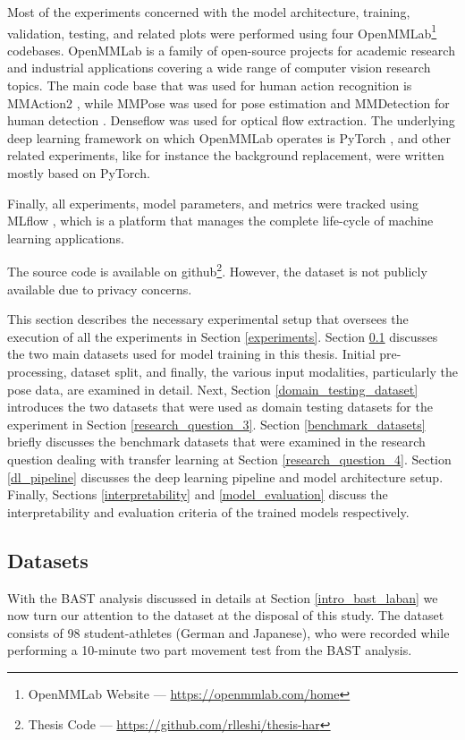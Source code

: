 \documentclass[extern,palatino]{cgMA}
\begin{document}
Most of the experiments concerned with the model architecture, training, validation, testing, and related plots were performed using four OpenMMLab\footnote{OpenMMLab Website --- \url{https://openmmlab.com/home}} codebases. OpenMMLab is a family of open-source projects for academic research and industrial applications covering a wide range of computer vision research topics. The main code base that was used for human action recognition is MMAction2 \cite{2020mmaction2}, while MMPose \cite{mmpose2020} was used for pose estimation and MMDetection for human detection \cite{mmdetection}. Denseflow \cite{denseflow} was used for optical flow extraction. The underlying deep learning framework on which OpenMMLab operates is PyTorch \cite{NEURIPS2019_9015}, and other related experiments, like for instance the background replacement, were written mostly based on PyTorch.

Finally, all experiments, model parameters, and metrics were tracked using MLflow \cite{zaharia2018accelerating}, which is a platform that manages the complete life-cycle of machine learning applications.

The source code is available on github\footnote{Thesis Code --- \url{https://github.com/rlleshi/thesis-har}}. However, the dataset is not publicly available due to privacy concerns.

\bigskip
\noindent This section describes the necessary experimental setup that oversees the execution of all the experiments in Section \ref{experiments}. Section \ref{bast_data} discusses the two main datasets used for model training in this thesis. Initial pre-processing, dataset split, and finally, the various input modalities, particularly the pose data, are examined in detail. Next, Section \ref{domain_testing_dataset} introduces the two datasets that were used as domain testing datasets for the experiment in Section \ref{research_question_3}. Section \ref{benchmark_datasets} briefly discusses the benchmark datasets that were examined in the research question dealing with transfer learning at Section \ref{research_question_4}. Section \ref{dl_pipeline} discusses the deep learning pipeline and model architecture setup. Finally, Sections \ref{interpretability} and \ref{model_evaluation} discuss the interpretability and evaluation criteria of the trained models respectively.

\subsection{Datasets}
\label{bast_data}
With the BAST analysis discussed in details at Section \ref{intro_bast_laban} we now turn our attention to the dataset at the disposal of this study. The dataset consists of 98 student-athletes (German and Japanese), who were recorded while performing a 10-minute two part movement test from the BAST analysis. 
\end{document}
